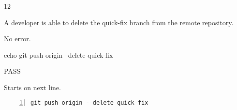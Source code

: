\begin{description}[align=right,leftmargin=3.2cm,labelindent=3.0cm]
\item[Step:] 12
\item[Confirm:] A developer is able to delete the quick-fix branch from the remote repository.
\item[Expectation:] No error.
\item[Command:] echo git  push origin --delete quick-fix
\item[Test Result:] PASS
\item[Evidence:] Starts on next line.
\end{description}
\begin{lstlisting}[numbers=left]
git push origin --delete quick-fix

\end{lstlisting}

